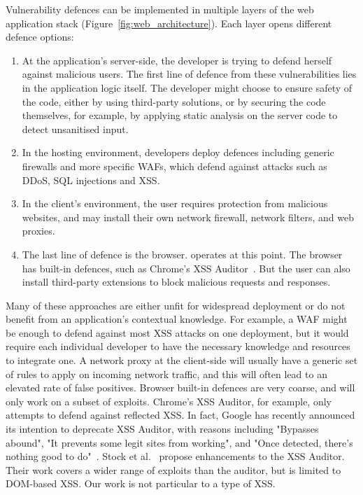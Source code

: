 Vulnerability defences can be implemented in multiple layers of the web application stack (Figure~\ref{fig:web_architecture}). Each layer opens different defence options:
\begin{enumerate}
	\item At the application's server-side, the developer is
          trying to defend herself against malicious users. The first
          line of defence from these vulnerabilities lies in the
          application logic itself. The developer might choose to
          ensure safety of the code, either by using third-party
          solutions, or by securing the code themselves, for example,
          by applying static analysis on the server code to detect
          unsanitised input.
	\item In the hosting environment, developers deploy
          defences including generic firewalls and more specific \acp{WAF}, which defend against attacks
          such as \ac{DDoS}, \ac{SQL} injections and \ac{XSS}.
	\item In the client's environment, the user requires protection from
          malicious websites, and may install their own network firewall,
          network filters, and web proxies.
	\item The last line of defence is the browser. \sys operates at this point.
          The browser has built-in defences, such as
          Chrome's \ac{XSS} Auditor~\cite{xssauditor}. But the user can also
          install third-party extensions to block malicious requests and
          responses. %
\end{enumerate}

Many of these approaches are either unfit for widespread deployment or
do not benefit from an application's contextual knowledge. For
example, a \ac{WAF} might be enough to defend against most \ac{XSS} attacks on
one deployment, but it would require each individual developer to have
the necessary knowledge and resources to integrate one. A network
proxy at the client-side will usually have a generic set of rules to
apply on incoming network traffic, and this will often lead to an
elevated rate of false positives. Browser built-in defences are very
coarse, and will only work on a subset of exploits. Chrome's XSS
Auditor, for example, only attempts to defend against reflected
\ac{XSS}. In fact, Google has recently announced its intention to deprecate
XSS Auditor, with reasons including "Bypasses abound", "It prevents
some legit sites from working", and "Once detected, there’s nothing
good to do"~\cite{deprecatexssauditor}. Stock et
al.~\cite{Stock:2017:WTI:3241189.3241265} propose enhancements to the
XSS Auditor. Their work covers a wider range of exploits than the
auditor, but is limited to DOM-based \ac{XSS}. Our work is not particular
to a type of \ac{XSS}.

